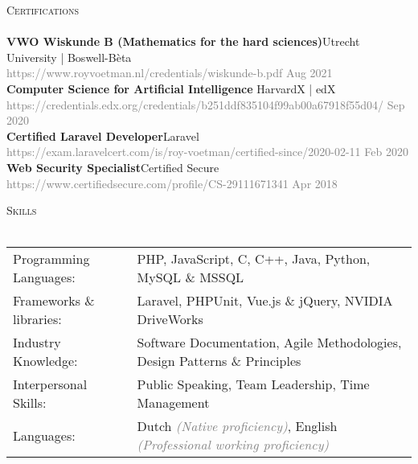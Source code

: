 \documentclass[a4paper]{article}
\newcommand{\lineunder} {
    \vspace*{-8pt} \\
    \hspace*{-18pt} \hrulefill \\
}
\newcommand{\header} [1] {
    {\hspace*{-18pt}\vspace*{6pt} \textsc{#1}}
    \vspace*{-6pt} \lineunder
}
\begin{document}
\header{Certifications}
\textbf{VWO Wiskunde B (Mathematics for the hard sciences)}\hfill Utrecht University | Boswell-Bèta\\
 \textcolor{gray}{https://www.royvoetman.nl/credentials/wiskunde-b.pdf}
 \hfill \textcolor{gray}{Aug 2021}\\
\vspace{2mm}
\textbf{Computer Science for Artificial Intelligence }\hfill HarvardX | edX\\
\textcolor{gray}{https://credentials.edx.org/credentials/b251ddf835104f99ab00a67918f55d04/} \hfill \textcolor{gray}{Sep 2020}\\
\vspace{2mm}
\textbf{Certified Laravel Developer}\hfill Laravel\\
\textcolor{gray}{https://exam.laravelcert.com/is/roy-voetman/certified-since/2020-02-11} \hfill \textcolor{gray}{Feb 2020}\\
\vspace{2mm}
\textbf{Web Security Specialist}\hfill Certified Secure\\
\textcolor{gray}{https://www.certifiedsecure.com/profile/CS-29111671341} \hfill \textcolor{gray}{Apr 2018}\\
\vspace{2mm}

\vspace{5mm}

\header{Skills}
\vspace{2mm}
\begin{tabular}{l l}

	Programming Languages:   & PHP, JavaScript, C, C++, Java, Python, MySQL \& MSSQL
	\vspace{1mm}\\
	
    Frameworks \& libraries: & Laravel, PHPUnit, Vue.js \& jQuery, NVIDIA DriveWorks
    \vspace{1mm}\\
    
	Industry Knowledge:      & Software Documentation, Agile Methodologies, Design Patterns \& Principles
	\vspace{1mm}\\
	
	Interpersonal Skills:    & Public Speaking, Team Leadership, Time Management
	\vspace{1mm}\\
	
    Languages:               & Dutch \textcolor{gray}{\emph{(Native proficiency)}}, English \textcolor{gray}{\emph{(Professional working proficiency)}}\\
    
\end{tabular}
\vspace{2mm}
\end{document}
